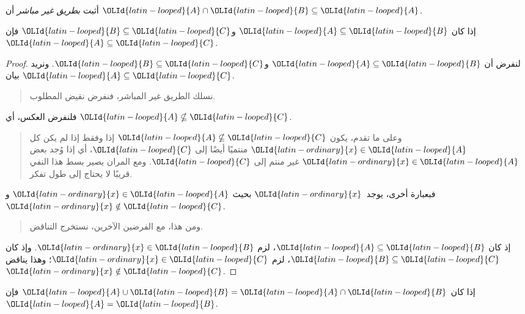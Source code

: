 \documentclass[../../../include/open-logic-section]{subfiles}
\begin{document}
\begin{prob}
أثبت \emph{بطريق غير مباشر} أن $\OLId{latin-looped}{A} \cap \OLId{latin-looped}{B} \subseteq \OLId{latin-looped}{A}$.
\end{prob}

\begin{prop}
إذا كان $\OLId{latin-looped}{A} \subseteq \OLId{latin-looped}{B}$ و$\OLId{latin-looped}{B} \subseteq \OLId{latin-looped}{C}$ فإن $\OLId{latin-looped}{A} \subseteq \OLId{latin-looped}{C}$.
\end{prop}

\begin{proof}
  لنفرض أن $\OLId{latin-looped}{A} \subseteq \OLId{latin-looped}{B}$ و$\OLId{latin-looped}{B} \subseteq \OLId{latin-looped}{C}$. ونريد بيان
  $\OLId{latin-looped}{A} \subseteq \OLId{latin-looped}{C}$.
  \begin{quote}
    نسلك الطريق غير المباشر، فنفرض نقيض المطلوب.
  \end{quote}
  فلنفرض العكس، أي $\OLId{latin-looped}{A} \nsubseteq \OLId{latin-looped}{C}$.
  \begin{quote}
    وعلى ما تقدم، يكون $\OLId{latin-looped}{A} \nsubseteq \OLId{latin-looped}{C}$ إذا وفقط إذا لم يكن كل
    $\OLId{latin-ordinary}{x} \in \OLId{latin-looped}{A}$ منتميًا أيضًا إلى $\OLId{latin-looped}{C}$، أي إذا وُجد بعض $\OLId{latin-ordinary}{x} \in \OLId{latin-looped}{A}$ غير
    منتم إلى $\OLId{latin-looped}{C}$. ومع المران يصير بسط هذا النفي قريبًا لا يحتاج إلى
    طول تفكر.
  \end{quote}
  فبعبارة أخرى، يوجد~$\OLId{latin-ordinary}{x}$ بحيث $\OLId{latin-ordinary}{x} \in \OLId{latin-looped}{A}$ و$\OLId{latin-ordinary}{x} \notin \OLId{latin-looped}{C}$.
  \begin{quote}
    ومن هذا، مع الفرضين الآخرين، نستخرج التناقض.
  \end{quote}
  إذ كان $\OLId{latin-looped}{A} \subseteq \OLId{latin-looped}{B}$، لزم $\OLId{latin-ordinary}{x} \in \OLId{latin-looped}{B}$. وإذ كان $\OLId{latin-looped}{B} \subseteq \OLId{latin-looped}{C}$،
  لزم $\OLId{latin-ordinary}{x} \in \OLId{latin-looped}{C}$؛ وهذا يناقض $\OLId{latin-ordinary}{x} \notin \OLId{latin-looped}{C}$.
\end{proof}

\begin{prop}
إذا كان $\OLId{latin-looped}{A} \cup \OLId{latin-looped}{B} = \OLId{latin-looped}{A} \cap \OLId{latin-looped}{B}$ فإن $\OLId{latin-looped}{A} = \OLId{latin-looped}{B}$.
\end{prop}
\end{document}
